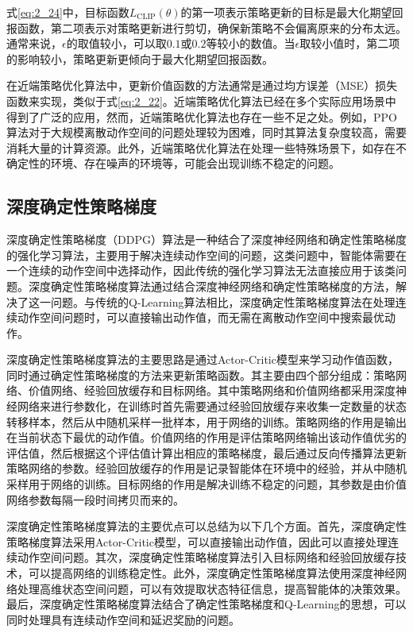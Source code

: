 式\ref{eq:2_24}中，目标函数$L_{\text{CLIP}}(\theta)$的第一项表示策略更新的目标是最大化期望回报函数，第二项表示对策略更新进行剪切，确保新策略不会偏离原来的分布太远。通常来说，$\epsilon$的取值较小，可以取$0.1$或$0.2$等较小的数值。当$\epsilon$取较小值时，第二项的影响较小，策略更新更倾向于最大化期望回报函数。

在近端策略优化算法中，更新价值函数的方法通常是通过均方误差（MSE）损失函数来实现，类似于式\ref{eq:2_22}。近端策略优化算法已经在多个实际应用场景中得到了广泛的应用，然而，近端策略优化算法也存在一些不足之处。例如，PPO算法对于大规模离散动作空间的问题处理较为困难，同时其算法复杂度较高，需要消耗大量的计算资源。此外，近端策略优化算法在处理一些特殊场景下，如存在不确定性的环境、存在噪声的环境等，可能会出现训练不稳定的问题。


\subsection{深度确定性策略梯度}

深度确定性策略梯度（DDPG）算法是一种结合了深度神经网络和确定性策略梯度的强化学习算法，主要用于解决连续动作空间的问题，这类问题中，智能体需要在一个连续的动作空间中选择动作，因此传统的强化学习算法无法直接应用于该类问题。深度确定性策略梯度算法通过结合深度神经网络和确定性策略梯度的方法，解决了这一问题。与传统的Q-Learning算法相比，深度确定性策略梯度算法在处理连续动作空间问题时，可以直接输出动作值，而无需在离散动作空间中搜索最优动作。

深度确定性策略梯度算法的主要思路是通过Actor-Critic模型来学习动作值函数，同时通过确定性策略梯度的方法来更新策略函数。其主要由四个部分组成：策略网络、价值网络、经验回放缓存和目标网络。其中策略网络和价值网络都采用深度神经网络来进行参数化，在训练时首先需要通过经验回放缓存来收集一定数量的状态转移样本，然后从中随机采样一批样本，用于网络的训练。策略网络的作用是输出在当前状态下最优的动作值。价值网络的作用是评估策略网络输出该动作值优劣的评估值，然后根据这个评估值计算出相应的策略梯度，最后通过反向传播算法更新策略网络的参数。经验回放缓存的作用是记录智能体在环境中的经验，并从中随机采样用于网络的训练。目标网络的作用是解决训练不稳定的问题，其参数是由价值网络参数每隔一段时间拷贝而来的。


深度确定性策略梯度算法的主要优点可以总结为以下几个方面。首先，深度确定性策略梯度算法采用Actor-Critic模型，可以直接输出动作值，因此可以直接处理连续动作空间问题。其次，深度确定性策略梯度算法引入目标网络和经验回放缓存技术，可以提高网络的训练稳定性。此外，深度确定性策略梯度算法使用深度神经网络处理高维状态空间问题，可以有效提取状态特征信息，提高智能体的决策效果。最后，深度确定性策略梯度算法结合了确定性策略梯度和Q-Learning的思想，可以同时处理具有连续动作空间和延迟奖励的问题。

